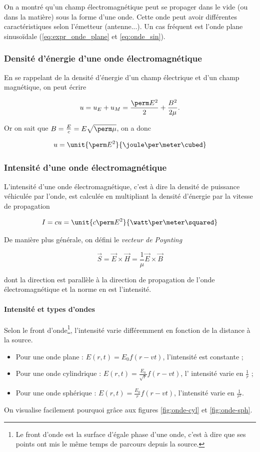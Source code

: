 On a montré qu'un champ électromagnétique peut se propager dans le vide
(ou dans la matière) sous la forme d'une onde. Cette onde peut avoir différentes
caractéristiques selon l'émetteur (antenne...).
Un cas fréquent est l'onde plane sinusoïdale (\eqref{eq:expr_onde_plane} et
\eqref{eq:onde_sin}).

\subsubsection{Densité d'énergie d'une onde électromagnétique}
En se rappelant de la densité d'énergie d'un champ électrique et
d'un champ magnétique, on peut écrire

$$u = u_E + u_M = \frac{\perm E^2}{2} + \frac{B^2}{2\mu}.$$

Or on sait que $B = \frac{E}{c} = E\sqrt{\perm\mu}$, on a donc

$$u = \unit{\perm E^2}{\joule\per\meter\cubed}$$

\subsubsection{Intensité d'une onde électromagnétique}
L'intensité d'une onde électromagnétique, c'est à
dire la densité de puissance véhiculée par l'onde, est calculée
en multipliant la densité d'énergie par la vitesse de propagation

$$I = cu = \unit{c\perm E^2}{\watt\per\meter\squared}$$

De manière plus générale, on défini le \emph{vecteur de Poynting}

\[\vec{S} = \vec{E} \times \vec{H} = \frac{1}{\mu} \vec{E} \times \vec{B}\]

dont la direction est parallèle à la direction de propagation de l'onde électromagnétique
et la norme en est l'intensité.

\paragraph{Intensité et types d'ondes}
Selon le front d'onde\footnote{Le front d'onde est la surface d'égale phase d'une onde,
c'est à dire que ses points ont mis le même temps de parcours depuis la source.},
l'intensité varie différemment en fonction de la distance à la source.
\begin{itemize}
	\item Pour une onde plane : $E(r,t) = E_0f(r-vt)$, l'intensité est constante ;	
	\item Pour une onde cylindrique : $E(r,t) = \frac{E_0}{\sqrt{r}}f(r-vt)$, l'
	intensité varie en $\frac{1}{r}$ ;
	\item Pour une onde sphérique : $E(r,t) = \frac{E_0}{r}f(r-vt)$, l'intensité
	varie en $\frac{1}{r^2}$.
\end{itemize}
On visualise facilement pourquoi grâce aux figures \ref{fig:onde-cyl} et
\ref{fig:onde-sph}.

